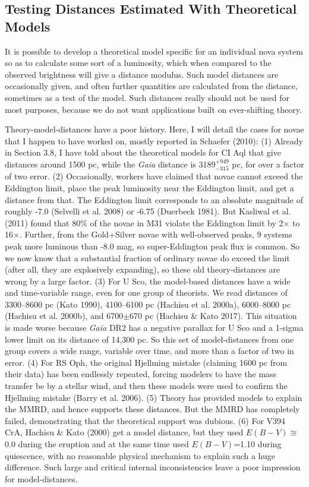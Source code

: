 \documentclass[a4paper,fleqn,usenatbib]{mnras}
\begin{document}
\subsection{Testing Distances Estimated With Theoretical Models}

It is possible to develop a theoretical model specific for an individual nova system so as to calculate some sort of a luminosity, which when compared to the observed brightness will give a distance modulus.  Such model distances are occasionally given, and often further quantities are calculated from the distance, sometimes as a test of the model.  Such distances really should not be used for most purposes, because we do not want applications built on ever-shifting theory.

Theory-model-distances have a poor history.  Here, I will detail the cases for novae that I happen to have worked on, mostly reported in Schaefer (2010):  (1) Already in Section 3.8, I have told about the theoretical models for CI Aql that give distances around 1500 pc, while the {\it Gaia} distance is 3189$^{+949}_{-315}$ pc, for over a factor of two error.  (2) Occasionally, workers have claimed that novae cannot exceed the Eddington limit, place the peak luminosity near the Eddington limit, and get a distance from that.  The Eddington limit corresponds to an absolute magnitude of roughly -7.0 (Selvelli et al. 2008) or -6.75 (Duerbeck 1981).  But Kasliwal et al. (2011) found that 80\% of the novae in M31 violate the Eddington limit by 2$\times$ to 16$\times$.  Further, from the Gold+Silver novae with well-observed peaks, 9 systems peak more luminous than -8.0 mag, so super-Eddington peak flux is common.  So we now know that a substantial fraction of ordinary novae do exceed the limit (after all, they are explosively expanding), so these old theory-distances are wrong by a large factor.  (3) For U Sco, the model-based distances have a wide and time-variable range, even for one group of theorists.  We read distances of 3300--8600 pc (Kato 1990), 4100--6100 pc (Hachisu et al. 2000a), 6000--8000 pc (Hachisu et al. 2000b), and 6700$\pm$670 pc (Hachisu \& Kato 2017).  This situation is made worse because {\it Gaia} DR2 has a negative parallax for U Sco and a 1-sigma lower limit on its distance of 14,300 pc.  So this set of model-distances from one group covers a wide range, variable over time, and more than a factor of two in error.  (4) For RS Oph, the original Hjellming mistake (claiming 1600 pc from their data) has been endlessly repeated, forcing modelers to have the mass transfer be by a stellar wind, and then these models were used to confirm the Hjellming mistake (Barry et al. 2006).  (5) Theory has provided models to explain the MMRD, and hence supports these distances.  But the MMRD has completely failed, demonstrating that the theoretical support was dubious.  (6) For V394 CrA, Hachisu \& Kato (2000) get a model distance, but they used $E(B-V)$$\cong$0.0 during the eruption and at the same time used $E(B-V)$=1.10 during quiescence, with no reasonable physical mechanism to explain such a huge difference.  Such large and critical internal inconsistencies leave a poor impression for model-distances.
\end{document}
